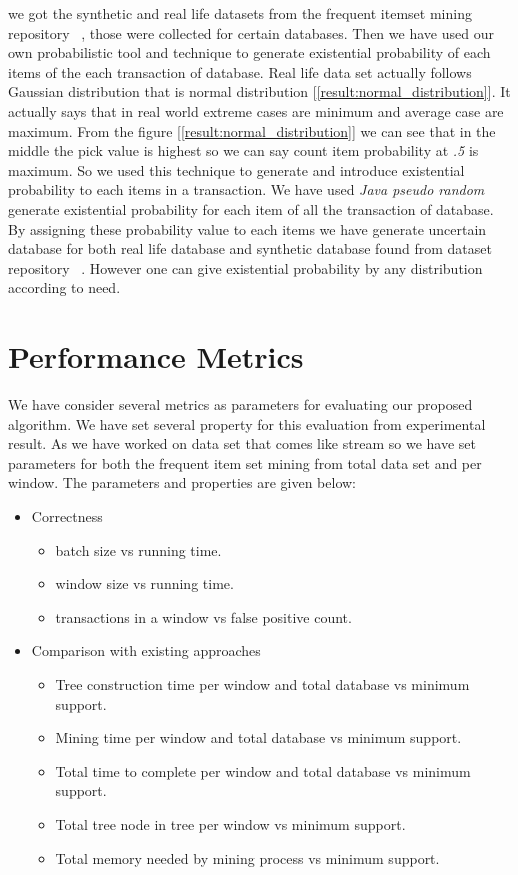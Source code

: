 
we got the synthetic and real life datasets from the frequent itemset mining repository ~\cite{dataset}, those were collected for certain databases. Then we have used our own probabilistic tool and technique to generate existential probability of each items of the each transaction of database. Real life data set actually follows Gaussian distribution that is normal distribution [\ref{result:normal_distribution}]. It actually says that in real world extreme cases are minimum and average case are maximum. From the figure [\ref{result:normal_distribution}] we can see that in the middle the pick value is highest so we can say count item probability at \emph{.5} is maximum. So we used this technique to generate and introduce existential probability to each items in a transaction. We have used \emph{Java pseudo random} generate existential probability for each item of all the transaction of database. By assigning these probability value to each items we have generate uncertain database for both real life database and synthetic database found from dataset repository ~\cite{dataset}. However one can give existential probability by any distribution according to need.


\section{Performance Metrics}
We have consider several metrics as parameters for evaluating our proposed algorithm. We have set several property for this evaluation from experimental result. As we have worked on data set that comes like stream so we have set parameters for both the frequent item set mining from total data set and per window. The parameters and properties are given below:

\begin{itemize}
	\item {Correctness}
	\begin{itemize}
		\item batch size vs running time.
		\item window size vs running time.
		\item transactions in a window vs false positive count.
	\end{itemize}
	\item {Comparison with existing approaches}
	\begin{itemize}
		\item Tree construction time per window and total database vs minimum support.
		\item Mining time per window and total database vs minimum support.
		\item Total time to complete per window and total database vs minimum support.
		\item Total tree node in tree per window vs minimum support.
		\item Total memory needed by mining process vs minimum support.
	\end{itemize}
\end{itemize}
